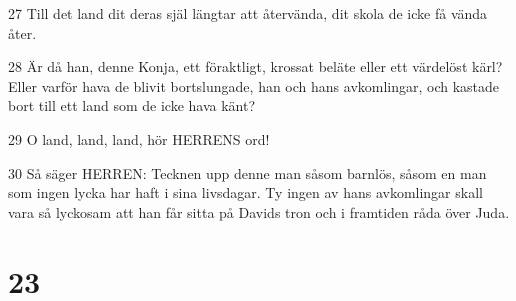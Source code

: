\par 27 Till det land dit deras själ längtar att återvända, dit skola de icke få vända åter.
\par 28 Är då han, denne Konja, ett föraktligt, krossat beläte eller ett värdelöst kärl? Eller varför hava de blivit bortslungade, han och hans avkomlingar, och kastade bort till ett land som de icke hava känt?
\par 29 O land, land, land, hör HERRENS ord!
\par 30 Så säger HERREN: Tecknen upp denne man såsom barnlös, såsom en man som ingen lycka har haft i sina livsdagar. Ty ingen av hans avkomlingar skall vara så lyckosam att han får sitta på Davids tron och i framtiden råda över Juda.

\chapter{23}

